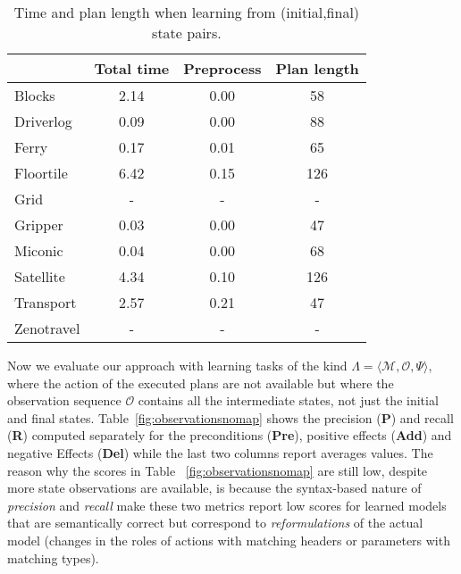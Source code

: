 \documentclass[3p,times]{elsarticle}
\newcommand{\tup}[1]{{\langle #1 \rangle}}
\begin{document}
\begin{table}
\begin{footnotesize}
	\begin{center}
		\begin{tabular}{l|c|c|c|}			
			 & Total time & Preprocess & Plan length  \\
			\hline
            Blocks & 2.14 & 0.00 & 58  \\
            Driverlog & 0.09 & 0.00 & 88 \\
            Ferry & 0.17 & 0.01 & 65 \\
            Floortile & 6.42 & 0.15 & 126 \\
            Grid & - & - & - \\
            Gripper & 0.03 & 0.00 & 47 \\
            Miconic & 0.04 & 0.00 & 68 \\
            Satellite & 4.34 & 0.10 & 126 \\
            Transport & 2.57 & 0.21 & 47 \\			
            Zenotravel & - & - & - \\
		\end{tabular}
	\end{center}
        \end{footnotesize}
	\caption{\small Time and plan length when learning from (initial,final) state pairs.}
	\label{tab:time_states}	
\end{table}

Now we evaluate our approach with learning tasks of the kind $\Lambda=\tup{\mathcal{M},\mathcal{O},\Psi}$, where the action of the executed plans are not available but where the observation sequence $\mathcal{O}$ contains all the intermediate states, not just the initial and final states. Table~\ref{fig:observationsnomap} shows the precision ({\bf P}) and recall ({\bf R}) computed separately for the preconditions ({\bf Pre}), positive effects ({\bf Add}) and negative Effects ({\bf Del}) while the last two columns report averages values. The reason why the scores in Table ~\ref{fig:observationsnomap} are still low, despite more state observations are available, is because the syntax-based nature of {\em precision} and {\em recall} make these two metrics report low scores for learned models that are semantically correct but correspond to {\em reformulations} of the actual model (changes in the roles of actions with matching headers or parameters with matching types).
\end{document}
